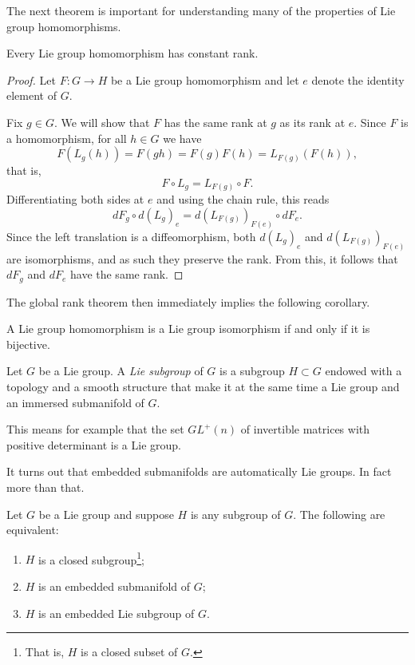 The next theorem is important for understanding many of the properties of Lie group homomorphisms.

\begin{theorem}
  Every Lie group homomorphism has constant rank.
\end{theorem}
\begin{proof}
  Let $F:G\to H$ be a Lie group homomorphism and let $e$ denote the identity element of $G$.
  
  Fix $g\in G$.
  We will show that $F$ has the same rank at $g$ as its rank at $e$.
  Since $F$ is a homomorphism, for all $h\in G$ we have
  \begin{equation}
    F(L_g(h)) = F(gh) = F(g)F(h) = L_{F(g)}(F(h)),
  \end{equation}
  that is,
  \begin{equation}
    F\circ L_g = L_{F(g)}\circ F.
  \end{equation}
  Differentiating both sides at $e$ and using the chain rule, this reads
  \begin{equation}
    dF_g\circ d(L_g)_e = d(L_{F(g)})_{F(e)}\circ dF_e.
  \end{equation}
  Since the left translation is a diffeomorphism, both $d(L_g)_e$ and $d(L_{F(g)})_{F(e)}$ are isomorphisms, and as such they preserve the rank.
  From this, it follows that $dF_g$ and $dF_e$ have the same rank.
\end{proof}

The global rank theorem then immediately implies the following corollary.
\begin{corollary}
  A Lie group homomorphism is a Lie group isomorphism if and only if it is bijective.
\end{corollary}

\begin{definition}
  Let $G$ be a Lie group. A \emph{Lie subgroup} of $G$ is a subgroup $H\subset G$ endowed with a topology and a smooth structure that make it at the same time a Lie group and an immersed submanifold of $G$.
\end{definition}

\begin{example}
  This means for example that the set $GL^+(n)$ of invertible matrices with positive determinant is a Lie group.
\end{example}

It turns out that embedded submanifolds are automatically Lie groups. In fact more than that.

\begin{theorem}
  Let $G$ be a Lie group and suppose $H$ is any subgroup of $G$.
  The following are equivalent:
  \begin{enumerate}
    \item $H$ is a closed subgroup\footnote{That is, $H$ is a closed subset of $G$.};
    \item $H$ is an embedded submanifold of $G$;
    \item $H$ is an embedded Lie subgroup of $G$.
  \end{enumerate}
\end{theorem}

